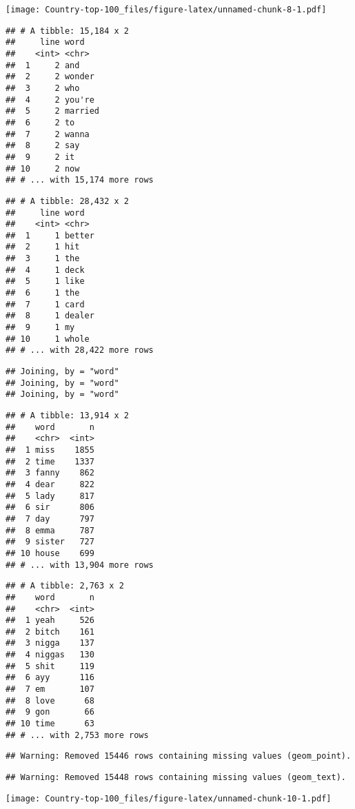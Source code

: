 \documentclass[]{article}
\begin{document}
\texttt{[image: Country-top-100\_files/figure-latex/unnamed-chunk-8-1.pdf]}

\begin{verbatim}
## # A tibble: 15,184 x 2
##     line word   
##    <int> <chr>  
##  1     2 and    
##  2     2 wonder 
##  3     2 who    
##  4     2 you're 
##  5     2 married
##  6     2 to     
##  7     2 wanna  
##  8     2 say    
##  9     2 it     
## 10     2 now    
## # ... with 15,174 more rows
\end{verbatim}

\begin{verbatim}
## # A tibble: 28,432 x 2
##     line word  
##    <int> <chr> 
##  1     1 better
##  2     1 hit   
##  3     1 the   
##  4     1 deck  
##  5     1 like  
##  6     1 the   
##  7     1 card  
##  8     1 dealer
##  9     1 my    
## 10     1 whole 
## # ... with 28,422 more rows
\end{verbatim}

\begin{verbatim}
## Joining, by = "word"
## Joining, by = "word"
## Joining, by = "word"
\end{verbatim}

\begin{verbatim}
## # A tibble: 13,914 x 2
##    word       n
##    <chr>  <int>
##  1 miss    1855
##  2 time    1337
##  3 fanny    862
##  4 dear     822
##  5 lady     817
##  6 sir      806
##  7 day      797
##  8 emma     787
##  9 sister   727
## 10 house    699
## # ... with 13,904 more rows
\end{verbatim}

\begin{verbatim}
## # A tibble: 2,763 x 2
##    word       n
##    <chr>  <int>
##  1 yeah     526
##  2 bitch    161
##  3 nigga    137
##  4 niggas   130
##  5 shit     119
##  6 ayy      116
##  7 em       107
##  8 love      68
##  9 gon       66
## 10 time      63
## # ... with 2,753 more rows
\end{verbatim}

\begin{verbatim}
## Warning: Removed 15446 rows containing missing values (geom_point).
\end{verbatim}

\begin{verbatim}
## Warning: Removed 15448 rows containing missing values (geom_text).
\end{verbatim}

\texttt{[image: Country-top-100\_files/figure-latex/unnamed-chunk-10-1.pdf]}
\end{document}

